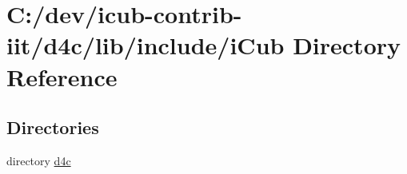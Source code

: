 \section{C\+:/dev/icub-\/contrib-\/iit/d4c/lib/include/i\+Cub Directory Reference}
\label{dir_05906369c2d654c318c8e5f0b9121080}
\subsection*{Directories}
\begin{DoxyCompactItemize}
\item 
directory \hyperlink{dir_dd932bb12c37a7efe8dbdca8fd16f2ba}{d4c}
\end{DoxyCompactItemize}
